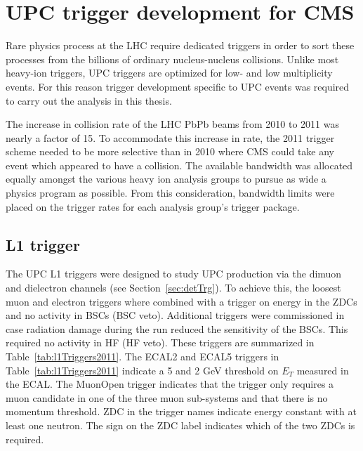 \chapter{\label{ch:trigg}UPC trigger development for CMS}
  Rare physics process at the LHC require dedicated triggers in order to sort
    these processes from the billions of ordinary nucleus-nucleus collisions. 
  Unlike most heavy-ion triggers, UPC triggers are optimized for low-\pt{} 
    and low multiplicity events. 
  For this reason trigger development specific to UPC events was required to
    carry out the analysis in this thesis.

  The increase in collision rate of the LHC PbPb beams from 2010 to 2011 was
    nearly a factor of 15. 
  To accommodate this increase in rate, the 2011 trigger scheme needed to be 
    more selective than in 2010 where CMS could take any event which 
    appeared to have a collision.
  The available bandwidth was allocated equally amongst the various heavy ion
    analysis groups to pursue as wide a physics program as possible.
  From this consideration, bandwidth limits were placed on the trigger rates
    for each analysis group's trigger package. 
  
  \section{\label{sec:l1Trigger}L1 trigger}
    The UPC L1 triggers were designed to study UPC \JPsi{} production via the 
      dimuon and dielectron channels (see Section~\ref{sec:detTrg}).
    To achieve this, the loosest muon and electron triggers where combined with
      a trigger on energy in the ZDCs and no activity in BSCs (BSC veto).
    Additional triggers were commissioned in case radiation damage during the 
      run reduced the sensitivity of the BSCs.
    This required no activity in HF (HF veto). 
    These triggers are summarized in Table~\ref{tab:l1Triggers2011}.
    The ECAL2 and ECAL5 triggers in Table~\ref{tab:l1Triggers2011}
      indicate a 5 and 2 GeV threshold on $E_{T}$ measured in the ECAL.
    The MuonOpen trigger indicates that the trigger only 
      requires a muon candidate in one of the three muon sub-systems and that
      there is no momentum threshold.
    ZDC in the trigger names indicate energy constant with at least one neutron.
    The sign on the ZDC label indicates which of the two ZDCs is required. 

